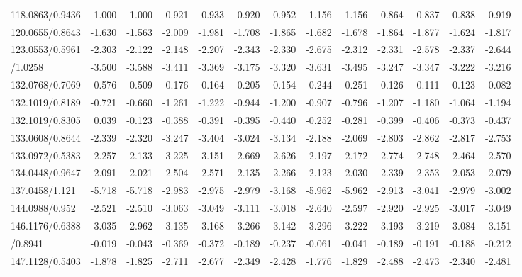 \documentclass[]{elsarticle} %
\begin{document}
\begin{table}[H]
{\begin{tabular}[t]{lrrrrrrrrrrrr}
\rowcolor{gray!6}  118.0863/0.9436 & -1.000 & -1.000 & -0.921 & -0.933 & -0.920 & -0.952 & -1.156 & -1.156 & -0.864 & -0.837 & -0.838 & -0.919\\
120.0655/0.8643 & -1.630 & -1.563 & -2.009 & -1.981 & -1.708 & -1.865 & -1.682 & -1.678 & -1.864 & -1.877 & -1.624 & -1.817\\
\rowcolor{gray!6}  123.0553/0.5961 & -2.303 & -2.122 & -2.148 & -2.207 & -2.343 & -2.330 & -2.675 & -2.312 & -2.331 & -2.578 & -2.337 & -2.644\\
\addlinespace
132.0655/1.0258 & -3.500 & -3.588 & -3.411 & -3.369 & -3.175 & -3.320 & -3.631 & -3.495 & -3.247 & -3.347 & -3.222 & -3.216\\
\rowcolor{gray!6}  132.0768/0.7069 & 0.576 & 0.509 & 0.176 & 0.164 & 0.205 & 0.154 & 0.244 & 0.251 & 0.126 & 0.111 & 0.123 & 0.082\\
132.1019/0.8189 & -0.721 & -0.660 & -1.261 & -1.222 & -0.944 & -1.200 & -0.907 & -0.796 & -1.207 & -1.180 & -1.064 & -1.194\\
\rowcolor{gray!6}  132.1019/0.8305 & 0.039 & -0.123 & -0.388 & -0.391 & -0.395 & -0.440 & -0.252 & -0.281 & -0.399 & -0.406 & -0.373 & -0.437\\
133.0608/0.8644 & -2.339 & -2.320 & -3.247 & -3.404 & -3.024 & -3.134 & -2.188 & -2.069 & -2.803 & -2.862 & -2.817 & -2.753\\
\addlinespace
\rowcolor{gray!6}  133.0972/0.5383 & -2.257 & -2.133 & -3.225 & -3.151 & -2.669 & -2.626 & -2.197 & -2.172 & -2.774 & -2.748 & -2.464 & -2.570\\
134.0448/0.9647 & -2.091 & -2.021 & -2.504 & -2.571 & -2.135 & -2.266 & -2.123 & -2.030 & -2.339 & -2.353 & -2.053 & -2.079\\
\rowcolor{gray!6}  137.0458/1.121 & -5.718 & -5.718 & -2.983 & -2.975 & -2.979 & -3.168 & -5.962 & -5.962 & -2.913 & -3.041 & -2.979 & -3.002\\
144.0988/0.952 & -2.521 & -2.510 & -3.063 & -3.049 & -3.111 & -3.018 & -2.640 & -2.597 & -2.920 & -2.925 & -3.017 & -3.049\\
\rowcolor{gray!6}  146.1176/0.6388 & -3.035 & -2.962 & -3.135 & -3.168 & -3.266 & -3.142 & -3.296 & -3.222 & -3.193 & -3.219 & -3.084 & -3.151\\
\addlinespace
147.0764/0.8941 & -0.019 & -0.043 & -0.369 & -0.372 & -0.189 & -0.237 & -0.061 & -0.041 & -0.189 & -0.191 & -0.188 & -0.212\\
\rowcolor{gray!6}  147.1128/0.5403 & -1.878 & -1.825 & -2.711 & -2.677 & -2.349 & -2.428 & -1.776 & -1.829 & -2.488 & -2.473 & -2.340 & -2.481\\

\end{tabular}}
\end{table}
\end{document}
